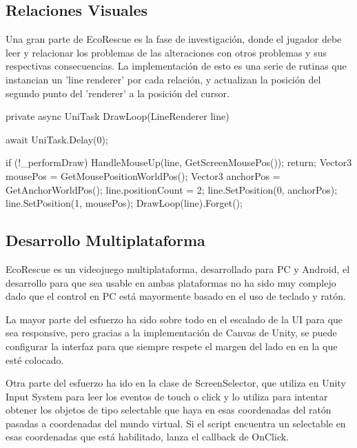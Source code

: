 \subsection{Relaciones Visuales}

Una gran parte de EcoRescue es la fase de investigación, donde el jugador debe leer y relacionar los problemas de las alteraciones con otros problemas y sus respectivas consecuencias. La implementación de esto es una serie de rutinas que instancian un 'line renderer' por cada relación, y actualizan la posición del segundo punto del 'renderer' a la posición del cursor.

\begin{mypython}[caption={Código para dibujar la línea de relaciones.},label={alg:drawloop}]
private async UniTask DrawLoop(LineRenderer line) 
{
    await UniTask.Delay(0);
    
    if (!_performDraw) 
    {
        HandleMouseUp(line, GetScreenMousePos());
        return;
    }
    Vector3 mousePos = GetMousePositionWorldPos();
    Vector3 anchorPos = GetAnchorWorldPos();
    line.positionCount = 2;
    line.SetPosition(0, anchorPos);
    line.SetPosition(1, mousePos);
    DrawLoop(line).Forget();
}
\end{mypython}

\subsection{Desarrollo Multiplataforma}

EcoRescue es un videojuego multiplataforma, desarrollado para PC y Android, el desarrollo para que sea usable en ambas plataformas no ha sido muy complejo dado que el control en PC está mayormente basado en el uso de teclado y ratón.

La mayor parte del esfuerzo ha sido sobre todo en el escalado de la UI para que sea responsive, pero gracias a la implementación de Canvas\cite{unitycanvas} de Unity, se puede configurar la interfaz para que siempre respete el margen del lado en en la que esté colocado.

Otra parte del esfuerzo ha ido en la clase de ScreenSelector, que utiliza en Unity Input System\cite{unityinputsystem} para leer los eventos de touch o click y lo utiliza para intentar obtener los objetos de tipo selectable que haya en esas coordenadas del ratón pasadas a coordenadas del mundo virtual. Si el script encuentra un selectable en esas coordenadas que está habilitado, lanza el callback de OnClick.

